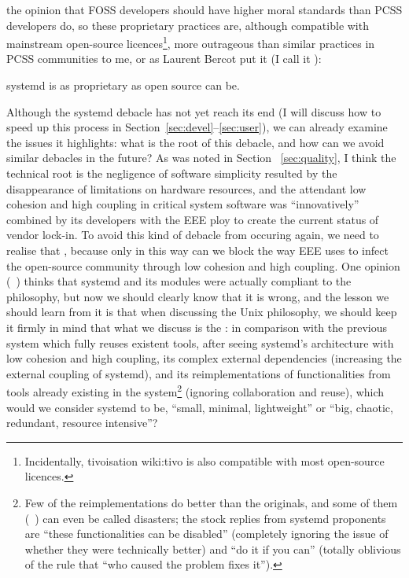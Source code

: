 the opinion that FOSS developers should have higher moral standards than PCSS
developers do, so these proprietary practices are, although compatible with
mainstream open-source licences\footnote{Incidentally, tivoisation\cupercite%
{wiki:tivo} is also compatible with most open-source licences.},
more outrageous than similar practices in PCSS communities to me,
or as Laurent Bercot put it
(I call it ):
\begin{quoting}
	systemd is as proprietary as open source can be.
\end{quoting}

Although the systemd debacle has not yet reach its end (I will discuss how
to speed up this process in Section~\ref{sec:devel}--\ref{sec:user}), we can
already examine the issues it highlights: what is the root of this debacle,
and how can we avoid similar debacles in the future?  As was noted in Section~%
\ref{sec:quality}, I think the technical root is the negligence of software
simplicity resulted by the disappearance of limitations on hardware resources,
and the attendant low cohesion and high coupling in critical system software
was ``innovatively'' combined by its developers with the EEE ploy to create the
current status of vendor lock-in.  To avoid this kind of debacle from occuring
again, we need to realise that , because only in this way can we block the way
EEE uses to infect the open-source community through low cohesion and high
coupling.  One opinion (\eg~\parencite{bugaev2016}) thinks that systemd and
its modules were actually compliant to the philosophy, but now we should clearly
know that it is wrong, and the lesson we should learn from it is that when
discussing the Unix philosophy, we should keep it firmly in mind that what we
discuss is the : in comparison with the
previous system which fully reuses existent tools, after seeing systemd's
architecture with low cohesion and high coupling, its complex external
dependencies (increasing the external coupling
of systemd), and its reimplementations of functionalities from tools
already existing in the system\footnote{Few
of the reimplementations do better than the originals, and some of them
(\eg~\parencite{wouters2016, david2018}) can even be called disasters; the
stock replies from systemd proponents are ``these functionalities can be
disabled'' (completely ignoring the issue of whether they were technically
better) and ``do it if you can'' (totally oblivious of the rule that ``who
caused the problem fixes it'').} (ignoring
collaboration and reuse), which would we consider systemd to be,
``small, minimal, lightweight'' or ``big, chaotic, redundant,
resource intensive''?


